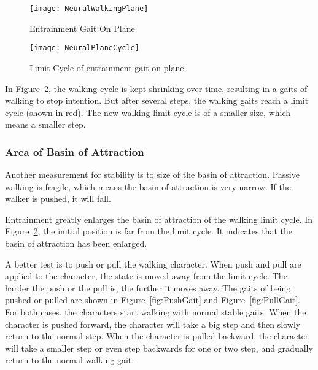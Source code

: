 \begin{figure}[!htbp]
  \begin{center}
     \texttt{[image: NeuralWalkingPlane]}
    \caption{Entrainment Gait On Plane}
    \label{fig:neuralwalkinggait}
\end{center}
\end{figure}

\begin{figure}[!htbp]
  \begin{center}
      \texttt{[image: NeuralPlaneCycle]}
    \caption{Limit Cycle of entrainment gait on plane}
    \label{fig:entrainmentLimitCycleOnPlane}
\end{center}
\end{figure}

In Figure~\ref{fig:entrainmentLimitCycleOnPlane}, the walking cycle is kept shrinking over time, resulting in a gaits of walking to stop intention. 
But after several steps, the walking gaits reach a limit cycle (shown in red). 
The new walking limit cycle is of a smaller size, which means a smaller step.


\subsubsection*{Area of Basin of Attraction}
Another measurement for stability is to size of the basin of attraction.
Passive walking is fragile, which means the basin of attraction is very narrow.
If the walker is pushed, it will fall.

Entrainment greatly enlarges the basin of attraction of the walking limit cycle.
In Figure~\ref{fig:entrainmentLimitCycleOnPlane}, the initial position is far from the limit cycle.
It indicates that the basin of attraction has been enlarged.

A better test is to push or pull the walking character.
When push and pull are applied to the character, the state is moved away from the limit cycle.
The harder the push or the pull is, the further it moves away.
The gaits of  being pushed or pulled are shown in Figure~\ref{fig:PushGait} and Figure~\ref{fig:PullGait}.
For both cases, the characters start walking with normal stable gaits.
When the character is pushed forward, the character will take a big step and then slowly return to the normal step.
When the character is pulled backward, the character will take a smaller step or even step backwards for one or two step, and  gradually return to the normal walking gait.


